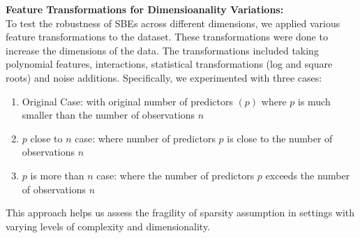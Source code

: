 \textbf{Feature Transformations for Dimensioanality Variations:}\\
To test the robustness of SBEs across different dimensions, we applied various feature transformations to the dataset.  These transformations were done to increase the dimensions of the data. The  transformations included taking polynomial features, interactions, statistical transformations (log and square roots) and noise additions. Specifically, we experimented with three cases: 
\begin{enumerate}
    \item Original Case: with original number of predictors $(p)$ where $p$ is much smaller than the number of observations $n$
    \item $p$ close to $n$ case: where number of predictors $p$ is close to the number of observations $n$
    \item $p$ is more than $n$ case: where the number of predictors $p$ exceeds the number of observations $n$
\end{enumerate}
This approach helps us assess the fragility of sparsity assumption in settings with varying levels of complexity and dimensionality.